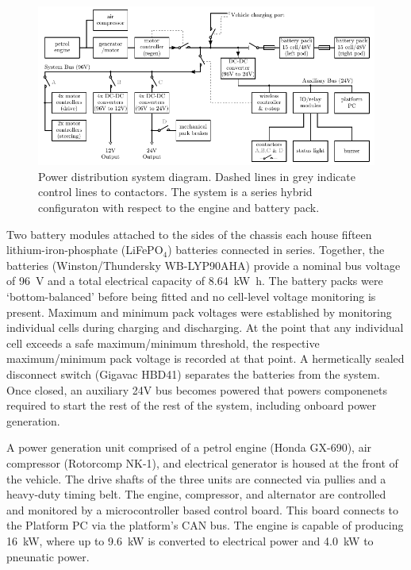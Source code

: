 \documentclass[preprint,authoryear,12pt]{elsarticle}
\begin{document}
        \begin{figure}[htb]
            \centering
            \includegraphics[width=\linewidth]{imgs/system_diagram/full-system-diagram_v1.pdf}
            \caption{Power distribution system diagram. Dashed lines in grey indicate control lines to contactors.
                     The system is a series hybrid configuraton with respect to the engine and battery pack.}
            \label{fig:power_system_diagram}
        \end{figure}

        Two battery modules attached to the sides of the chassis each house fifteen lithium-iron-phosphate (LiFePO$_{\text{4}}$) batteries connected in series.
        Together, the batteries (Winston/Thundersky WB-LYP90AHA) provide a nominal bus voltage of \SI{96}{\volt} and a total electrical capacity of \SI{8.64}{\kilo\watt\hour}.
        The battery packs were `bottom-balanced' before being fitted and no cell-level voltage monitoring is present.
        Maximum and minimum pack voltages were established by monitoring individual cells during charging and discharging.
        At the point that any individual cell exceeds a safe maximum/minimum threshold, the respective maximum/minimum pack voltage is recorded at that point.
        A hermetically sealed disconnect switch (Gigavac HBD41) separates the batteries from the system.
        Once closed, an auxiliary 24V bus becomes powered that powers componenets required to start the rest of the rest of the system, including onboard power generation.

        A power generation unit comprised of a petrol engine (Honda GX-690), air compressor (Rotorcomp NK-1), and electrical generator is housed at the front of the vehicle.
        The drive shafts of the three units are connected via pullies and a heavy-duty timing belt.
        The engine, compressor, and alternator are controlled and monitored by a microcontroller based control board.
        This board connects to the Platform PC via the platform's CAN bus.
        The engine is capable of producing \SI{16}{\kilo\watt}, where up to \SI{9.6}{\kilo\watt} is converted to electrical power and \SI{4.0}{\kilo\watt} to pneunatic power.
\end{document}
